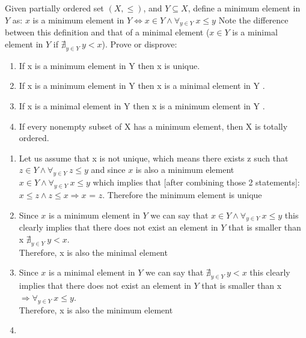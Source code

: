 \documentclass[12pt]{article}
\newenvironment{solution}[2][Solution]{ \begin{trivlist}
\item[\hskip \labelsep {\bfseries #1}]}{\end{trivlist}}
\newenvironment{problem}[2][Problem]{\begin{trivlist}
\item[\hskip \labelsep {\bfseries #1}\hskip \labelsep {\bfseries #2.}]}{\end{trivlist}}
\begin{document}
\begin{problem}{11}Given partially ordered set $(X,\le)$, and $Y \subseteq X$, define a minimum element in $Y$ as: 
\vskip 0.1in
$x$ is a minimum element in $Y \Leftrightarrow x \in Y \wedge \forall_{y \in Y}\ x \le y$
\vskip 0.1in
Note the difference between this definition and that of a minimal element ($x \in Y$ is a minimal element in $Y$ if  $\nexists_{y \in Y}\ y < x$). Prove or disprove:
\item[]
\begin{enumerate}[label=\alph*)]
    \item If x is a minimum element in Y then x is unique.
    \item If x is a minimum element in Y then x is a minimal element in Y .
    \item If x is a minimal element in Y then x is a minimum element in Y .
    \item If every nonempty subset of X has a minimum element, then X is totally ordered.
\end{enumerate}
\end{problem}
\begin{solution}{11}
\item[]
\begin{enumerate}[label=\alph*)]
    \item Let us assume that x is not unique, which means there exists z such that $z \in Y \wedge  \forall_{y \in Y}\ z \le y$ and since $x$ is also a minimum element $x \in Y \wedge \forall_{y \in Y}\ x \le y$ which implies that [after combining those 2 statements]: $x \le z \wedge z \le x \Rightarrow x$ = $z$. Therefore the minimum element is unique
    \item Since $x$ is a minimum element in $Y$ we can say that $ x \in Y \wedge \forall_{y \in Y}\ x \le y$ this clearly implies that there does not exist an element in $Y$ that is smaller than x $\nexists_{y \in Y}\ y < x$.\\ Therefore, x is also the minimal element
    \item Since $x$ is a minimal element in $Y$ we can say that $\nexists_{y \in Y}\ y < x$  this clearly implies that there does not exist an element in $Y$ that is smaller than x $ \Rightarrow \forall_{y \in Y}\ x \le y$.\\ Therefore, x is also the minimum element
    \item
\end{enumerate}
\end{solution}
\end{document}
